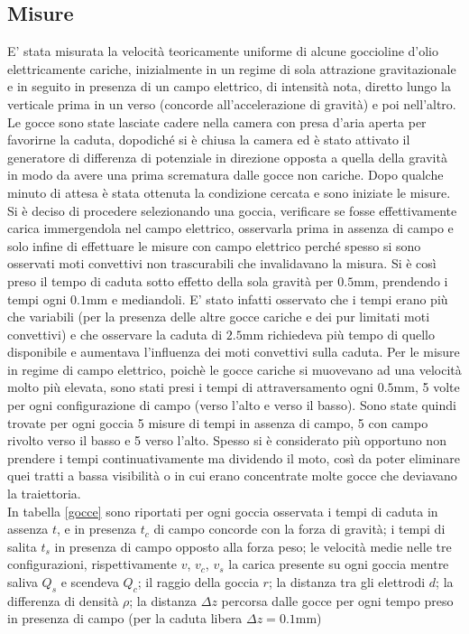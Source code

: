 \documentclass{article}
\begin{document}
\subsection{Misure}
    E' stata misurata la velocità teoricamente uniforme di alcune goccioline d’olio elettricamente cariche, inizialmente in un regime di sola attrazione gravitazionale e in seguito in presenza di un campo elettrico, di intensità nota, diretto lungo la verticale prima in un verso (concorde all'accelerazione di gravità) e poi nell'altro. \\
    Le gocce sono state lasciate cadere nella camera con presa d'aria aperta per favorirne la caduta, dopodiché si è chiusa la camera ed è stato attivato il generatore di differenza di potenziale in direzione opposta a quella della gravità in modo da avere una prima scrematura dalle gocce non cariche. Dopo qualche minuto di attesa è stata ottenuta la condizione cercata e sono iniziate le misure. \\
    Si è deciso di procedere selezionando una goccia, verificare se fosse effettivamente carica immergendola nel campo elettrico, osservarla prima in assenza di campo e solo infine di effettuare le misure con campo elettrico perché spesso si sono osservati moti convettivi non trascurabili che invalidavano la misura. Si è così preso il tempo di caduta sotto effetto della sola gravità per $0.5$mm, prendendo i tempi ogni $0.1$mm e mediandoli. E' stato infatti osservato che i tempi erano più che variabili (per la presenza delle altre gocce cariche e dei pur limitati moti convettivi) e che osservare la caduta di $2.5$mm richiedeva più tempo di quello disponibile e aumentava l'influenza dei moti convettivi sulla caduta. Per le misure in regime di campo elettrico, poichè le gocce cariche si muovevano ad una velocità molto più elevata, sono stati presi i tempi di attraversamento ogni $0.5$mm, 5 volte per ogni configurazione di campo (verso l'alto e verso il basso).
    Sono state quindi trovate per ogni goccia 5 misure di tempi in assenza di campo, 5 con campo rivolto verso il basso e 5 verso l'alto. Spesso si è considerato più opportuno non prendere i tempi continuativamente ma dividendo il moto, così da poter eliminare quei tratti a bassa visibilità o in cui erano concentrate molte gocce che deviavano la traiettoria.\\
    In tabella \ref{gocce} sono riportati per ogni goccia osservata i tempi di caduta in assenza $t$, e in presenza $t_c$ di campo concorde con la forza di gravità; i tempi di salita $t_s$ in presenza di campo opposto alla forza peso; le velocità medie nelle tre configurazioni, rispettivamente $v$, $v_c$, $v_s$ la carica presente su ogni goccia mentre saliva $Q_s$ e scendeva $Q_c$; il raggio della goccia $r$; la distanza tra gli elettrodi $d$; la differenza di densità $\rho$; la distanza $\Delta z$ percorsa dalle gocce per ogni tempo preso in presenza di campo (per la caduta libera $\Delta z = 0.1$mm)
\end{document}
